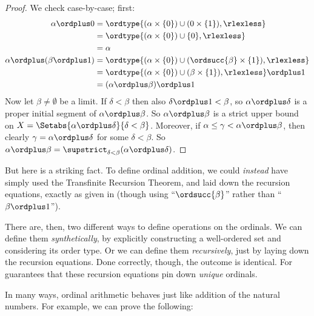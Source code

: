 \documentclass[../../../include/open-logic-section]{subfiles}
\begin{document}
\begin{proof}
We check case-by-case; first:
\begin{align*}
	\alpha \ordplus  0 
	& = \ordtype{(\alpha \times \{0\}) \cup (0 \times \{1\}), \rlexless} \\
	&= \ordtype{(\alpha \times \{0\}) \cup \{0\}, \rlexless}\\
	&= \alpha\\
	\alpha \ordplus (\beta \ordplus  1) 
	&= \ordtype{(\alpha\times \{0\}) \cup (\ordsucc{\beta}\times \{1\}), \rlexless} \\
	&= \ordtype{(\alpha\times \{0\}) \cup (\beta \times \{1\}), \rlexless} \ordplus 1\\
	&= (\alpha \ordplus  \beta) \ordplus  1
\end{align*}
Now let $\beta \neq \emptyset$ be a limit. If $\delta < \beta$ then
also $\delta\ordplus 1 < \beta$, so $\alpha \ordplus  \delta$ is a
proper initial segment of $\alpha \ordplus  \beta$. So $\alpha
\ordplus  \beta$ is a strict upper bound on $X = \Setabs{\alpha
\ordplus  \delta}{\delta < \beta}$. Moreover, if $\alpha \leq \gamma <
\alpha \ordplus  \beta$, then clearly $\gamma = \alpha \ordplus
\delta$ for some $\delta < \beta$. So $\alpha \ordplus  \beta =
\supstrict_{\delta< \beta}(\alpha\ordplus \delta)$.
\end{proof}

But here is a striking fact. To define ordinal addition, we could
\emph{instead} have simply used the Transfinite Recursion Theorem, and
laid down the recursion equations, exactly as given in
 (though using ``$\ordsucc{\beta}$''
rather than ``$\beta \ordplus 1$'').

There are, then, two different ways to define operations on the
ordinals. We can define them \emph{synthetically}, by explicitly
constructing a well-ordered set and considering its order type. Or we
can define them \emph{recursively}, just by laying down the recursion
equations. Done correctly, though, the outcome is identical. For
 guarantees
that these recursion equations pin down \emph{unique} ordinals.

In many ways, ordinal arithmetic behaves just like addition of the
natural numbers. For example, we can prove the following:
\end{document}
